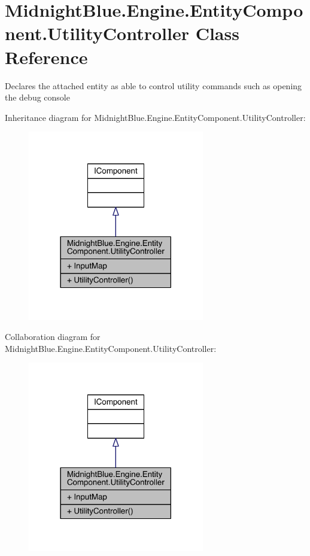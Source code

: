\hypertarget{class_midnight_blue_1_1_engine_1_1_entity_component_1_1_utility_controller}{}\section{Midnight\+Blue.\+Engine.\+Entity\+Component.\+Utility\+Controller Class Reference}
\label{class_midnight_blue_1_1_engine_1_1_entity_component_1_1_utility_controller}


Declares the attached entity as able to control utility commands such as opening the debug console  




Inheritance diagram for Midnight\+Blue.\+Engine.\+Entity\+Component.\+Utility\+Controller\+:
\nopagebreak
\begin{figure}[H]
\begin{center}
\leavevmode
\includegraphics[width=218pt]{class_midnight_blue_1_1_engine_1_1_entity_component_1_1_utility_controller__inherit__graph}
\end{center}
\end{figure}


Collaboration diagram for Midnight\+Blue.\+Engine.\+Entity\+Component.\+Utility\+Controller\+:
\nopagebreak
\begin{figure}[H]
\begin{center}
\leavevmode
\includegraphics[width=218pt]{class_midnight_blue_1_1_engine_1_1_entity_component_1_1_utility_controller__coll__graph}
\end{center}
\end{figure}
